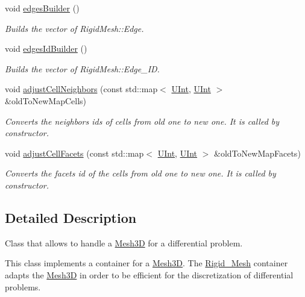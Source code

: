 \begin{DoxyCompactItemize}
void \hyperlink{classFVCode3D_1_1Rigid__Mesh_aaceb00b0d75dee23a330033d46f592c7}{edges\+Builder} ()
\begin{DoxyCompactList}\small\item\em Builds the vector of Rigid\+Mesh\+::\+Edge. \end{DoxyCompactList}\item 
void \hyperlink{classFVCode3D_1_1Rigid__Mesh_a68a8a1bcfe66af2379baa44772026fd3}{edges\+Id\+Builder} ()
\begin{DoxyCompactList}\small\item\em Builds the vector of Rigid\+Mesh\+::\+Edge\+\_\+\+ID. \end{DoxyCompactList}\item 
void \hyperlink{classFVCode3D_1_1Rigid__Mesh_a137e1a9da5d7fadfac8053c15ff4749b}{adjust\+Cell\+Neighbors} (const std\+::map$<$ \hyperlink{namespaceFVCode3D_a4bf7e328c75d0fd504050d040ebe9eda}{U\+Int}, \hyperlink{namespaceFVCode3D_a4bf7e328c75d0fd504050d040ebe9eda}{U\+Int} $>$ \&old\+To\+New\+Map\+Cells)
\begin{DoxyCompactList}\small\item\em Converts the neighbors ids of cells from old one to new one. It is called by constructor. \end{DoxyCompactList}\item 
void \hyperlink{classFVCode3D_1_1Rigid__Mesh_a24c847643d9dc98dc3e7b2435e22cdf6}{adjust\+Cell\+Facets} (const std\+::map$<$ \hyperlink{namespaceFVCode3D_a4bf7e328c75d0fd504050d040ebe9eda}{U\+Int}, \hyperlink{namespaceFVCode3D_a4bf7e328c75d0fd504050d040ebe9eda}{U\+Int} $>$ \&old\+To\+New\+Map\+Facets)
\begin{DoxyCompactList}\small\item\em Converts the facets id of the cells from old one to new one. It is called by constructor. \end{DoxyCompactList}\end{DoxyCompactItemize}


\subsection{Detailed Description}
Class that allows to handle a \hyperlink{classFVCode3D_1_1Mesh3D}{Mesh3D} for a differential problem. 

This class implements a container for a \hyperlink{classFVCode3D_1_1Mesh3D}{Mesh3D}. The \hyperlink{classFVCode3D_1_1Rigid__Mesh}{Rigid\+\_\+\+Mesh} container adapts the \hyperlink{classFVCode3D_1_1Mesh3D}{Mesh3D} in order to be efficient for the discretization of differential problems. 

